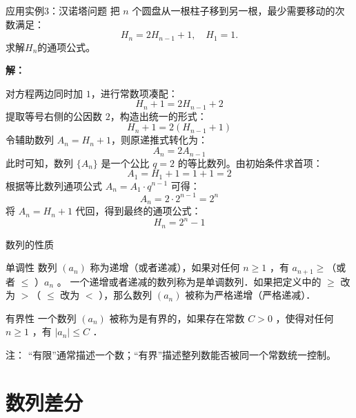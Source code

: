 \documentclass[aspectratio=169,10pt]{ctexbeamer}
\begin{document}
\begin{frame}
	\footnotesize
	\begin{block}{应用实例3：汉诺塔问题}
	把 \(n\) 个圆盘从一根柱子移到另一根，最少需要移动的次数满足：
	\[
	H_n = 2H_{n-1} + 1,\quad H_1 = 1.
	\]
	求解$H_n$的通项公式。
	\end{block}
	\pause
	\scriptsize
	\textbf{解：}
	
		 对方程两边同时加 $1$，进行常数项凑配：
		\[
		H_n + 1 = 2H_{n-1} + 2
		\]
		 提取等号右侧的公因数 $2$，构造出统一的形式：
		\[
		H_n + 1 = 2(H_{n-1} + 1)
		\]
		令辅助数列 $A_n = H_n + 1$，则原递推式转化为：
		\[
		A_n = 2A_{n-1}
		\]
		 此时可知，数列 $\{A_n\}$ 是一个公比 $q=2$ 的等比数列。由初始条件求首项：
		\[
		A_1 = H_1 + 1 = 1 + 1 = 2
		\]
		 根据等比数列通项公式 $A_n = A_1 \cdot q^{n-1}$ 可得：
		\[
		A_n = 2 \cdot 2^{n-1} = 2^n
		\]
		将 $A_n = H_n + 1$ 代回，得到最终的通项公式：
		\[
		H_n = 2^n - 1
		\]

	
	
	
\end{frame}






\begin{frame}{数列的性质}
	
	\begin{block}{单调性}
		数列 $\left(a_n\right)$ 称为递增（或者递减），如果对任何 $n \geqslant 1$ ，有 $a_{n+1} \geqslant$（或者 $\leqslant$ ）$a_n$ 。
		一个递增或者递减的数列称为是单调数列．如果把定义中的 $\geqslant$ 改为 $>$（ $\leqslant$ 改为 $<$ ），那么数列 $\left(a_n\right)$ 被称为严格递增（严格递减）．
	\end{block}
	\vspace{0.5cm}
	\begin{block}{有界性}
		一个数列 $\left(a_n\right)$ 被称为是有界的，如果存在常数 $C>0$ ，使得对任何$n \geqslant 1$ ，有 $\left|a_n\right| \leqslant C$ ．
	\end{block}
	\begin{alertblock}{注：}
		“有限”通常描述一个数；“有界”描述整列数能否被同一个常数统一控制。
	\end{alertblock}
	
	
\end{frame}










\section{数列差分}
\end{document}
